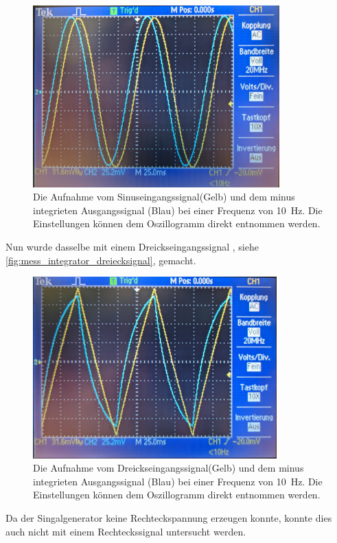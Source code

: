 \documentclass[12pt,english,ngerman]{scrartcl}
\begin{document}
\begin{figure}[H]
  \centering
    \includegraphics[width=\linewidth, height=7cm]{./figures/integrator/sinussignal.jpg}
  \caption{Die Aufnahme vom Sinuseingangssignal(Gelb) und dem minus integrieten
  Ausgangssignal (Blau) bei einer Frequenz von \SI{10}{\hertz}. Die
  Einstellungen können dem Oszillogramm direkt entnommen werden.}
  \label{fig:mess_integrator_sinussignal}
\end{figure}

Nun wurde dasselbe mit einem Dreickseingangssignal
, siehe \autoref{fig:mess_integrator_dreiecksignal}, gemacht.

\begin{figure}[H]
  \centering
    \includegraphics[width=\linewidth, height=7cm]{./figures/integrator/dreiecksignal.jpg}
  \caption{Die Aufnahme vom Dreickseingangssignal(Gelb) und dem minus integrieten
  Ausgangssignal (Blau) bei einer Frequenz von \SI{10}{\hertz}. Die
  Einstellungen können dem Oszillogramm direkt entnommen werden.}
  \label{fig:mess_integrator_dreiecksignal}
\end{figure}

Da der Singalgenerator \cite{funktionsgenerator} keine Rechteckspannung erzeugen konnte, konnte
dies auch nicht mit einem Rechteckssignal untersucht werden.
\end{document}
